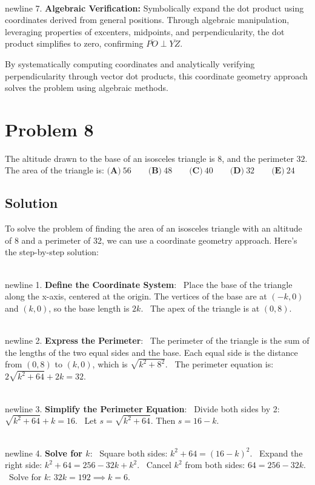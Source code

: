 \documentclass{article}
\begin{document}
\\newline 7. \textbf{Algebraic Verification:}
   Symbolically expand the dot product using coordinates derived from general positions. Through algebraic manipulation, leveraging properties of excenters, midpoints, and perpendicularity, the dot product simplifies to zero, confirming \(\overline{PO} \perp \overline{YZ}\).

By systematically computing coordinates and analytically verifying perpendicularity through vector dot products, this coordinate geometry approach solves the problem using algebraic methods.
\hrulefill
\newpage
\section*{Problem 8}
The altitude drawn to the base of an isosceles triangle is \(8\), and the perimeter \(32\). The area of the triangle is:
\(\textbf{(A)}\ 56\qquad  \textbf{(B)}\ 48\qquad  \textbf{(C)}\ 40\qquad  \textbf{(D)}\ 32\qquad  \textbf{(E)}\ 24\)

\subsection*{Solution}
To solve the problem of finding the area of an isosceles triangle with an altitude of 8 and a perimeter of 32, we can use a coordinate geometry approach. Here's the step-by-step solution:

\\newline 1. \textbf{Define the Coordinate System}:
\noindent \textbullet\ Place the base of the triangle along the x-axis, centered at the origin. The vertices of the base are at \((-k, 0)\) and \((k, 0)\), so the base length is \(2k\).
\noindent \textbullet\ The apex of the triangle is at \((0, 8)\).

\\newline 2. \textbf{Express the Perimeter}:
\noindent \textbullet\ The perimeter of the triangle is the sum of the lengths of the two equal sides and the base. Each equal side is the distance from \((0, 8)\) to \((k, 0)\), which is \(\sqrt{k^2 + 8^2}\).
\noindent \textbullet\ The perimeter equation is: \(2\sqrt{k^2 + 64} + 2k = 32\).

\\newline 3. \textbf{Simplify the Perimeter Equation}:
\noindent \textbullet\ Divide both sides by 2: \(\sqrt{k^2 + 64} + k = 16\).
\noindent \textbullet\ Let \(s = \sqrt{k^2 + 64}\). Then \(s = 16 - k\).

\\newline 4. \textbf{Solve for \(k\)}:
\noindent \textbullet\ Square both sides: \(k^2 + 64 = (16 - k)^2\).
\noindent \textbullet\ Expand the right side: \(k^2 + 64 = 256 - 32k + k^2\).
\noindent \textbullet\ Cancel \(k^2\) from both sides: \(64 = 256 - 32k\).
\noindent \textbullet\ Solve for \(k\): \(32k = 192 \implies k = 6\).
\end{document}

